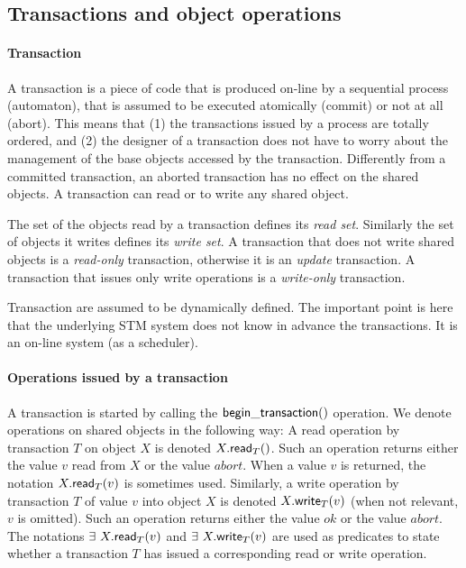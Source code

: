 \subsection{Transactions and object operations}
\label{base-definitions}

\paragraph{Transaction}
A transaction is  a piece of code that is produced  on-line by a sequential
process (automaton), that is assumed to be executed  atomically (commit) or
not  at all  (abort). This  means  that (1)  the transactions  issued by  a
process are totally ordered, and (2) the designer of a transaction does 
not have to  worry about the  management of the  base objects  accessed  
by the transaction.  Differently from  a committed transaction, an aborted  
transaction has no effect on the shared objects. 
A transaction  can read or to write any shared object. 
 

The set of the objects read by a transaction  defines its
{\it read  set}.  Similarly the set  of objects it writes  defines its 
{\it write set}. A transaction that does not  write shared objects is 
a  {\it  read-only}  transaction, otherwise it is an {\it update}
transaction.  A transaction that issues only write operations is 
a {\it write-only}  transaction. 

Transaction are assumed to be dynamically defined. The important point is here 
that the  underlying STM system does not know in advance the transactions. 
It is an  on-line system (as a scheduler).  



\paragraph{Operations issued by a transaction}
A transaction is started by calling the ${\sf begin\_transaction}()$ operation.
We denote operations on shared objects in the following way:
A read operation by transaction $T$ on object $X$ is denoted
$X.{\sf read}_T()$. Such an operation returns either the value $v$ read from 
$X$ or the value $abort$.  When a value $v$ is returned, 
the notation  $X.{\sf read}_T(v)$ is sometimes used.  
%
Similarly, a write operation by transaction $T$ of value $v$ into object 
$X$ is denoted $X.{\sf write}_T(v)$ (when not relevant, $v$ is omitted). 
Such an operation returns either the value $ok$ or the value $abort$. 
%
The notations $\exists~ X.{\sf read}_T(v)$  and $\exists~ X.{\sf write}_T(v)$ 
are  used as  predicates to  state whether a transaction  $T$ has issued a
corresponding read or write operation. 


